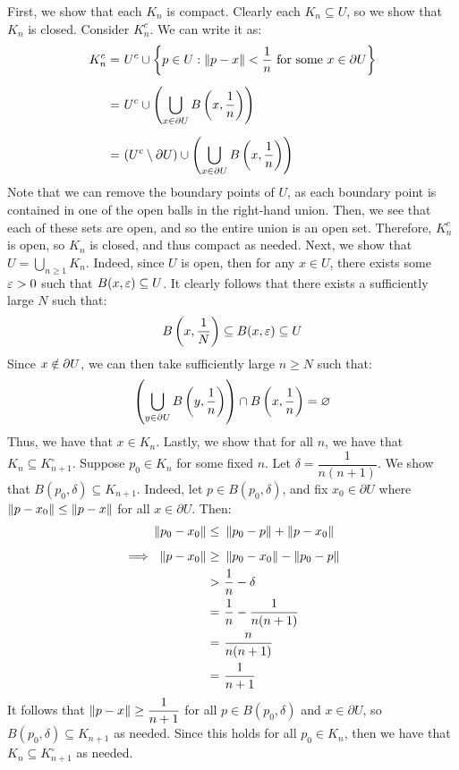 \begin{soln}
    First, we show that each $ K_{n} $ is compact.
    Clearly each $ K_{n} \subseteq U $, so we show that $ K_{n} $ is closed.
    Consider $ K_{n}^{c} $. We can write it as:
    \begin{align*}
        K_{n}^{c} = \ & U^{c} \cup \set{p \in U: \norm{p - x} <
        \frac{1}{n} \trm{ for some } x \in \partial U} \vsp
        = \ & U^{c} \cup \left( \bigcup_{x \in \partial U}
        B \left( x, \frac{1}{n} \right) \right) \vsp
        = \ & (U^{c} \setminus \partial U) \cup \left( \bigcup_{x \in \p U}
        B \left( x, \frac{1}{n} \right) \right)
    \end{align*}
    Note that we can remove the boundary points of $ U $, as each boundary point
    is contained in one of the open balls in the right-hand union.
    Then, we see that each of these sets are open, and so the entire union is an
    open set. Therefore, $ K_{n}^{c} $ is open, so $ K_{n} $ is closed, and thus
    compact as needed. \vsp
    Next, we show that $ U = \bigcup_{n \geq 1}K_{n} $.
    Indeed, since $ U $ is open, then for any $ x \in U $, there exists some
    $ \operatorname{\varepsilon} > 0 $ such that $ B(x, \operatorname{\varepsilon}) \subseteq U $. It clearly follows that
    there exists a sufficiently large $ N $ such that:
    \begin{equation*}
        B \left( x, \frac{1}{N} \right) \subseteq B(x, \operatorname{\varepsilon}) \subseteq U
    \end{equation*}
    Since $ x \notin \partial U $, we can then take sufficiently large $ n \geq N $
    such that:
    \begin{equation*}
        \left( \bigcup_{y \in \partial U}B \left( y, \frac{1}{n} \right) \right)\cap B
        \left( x, \frac{1}{n} \right) = \varnothing
    \end{equation*}
    Thus, we have that $ x \in K_{n} $. \vsp
    Lastly, we show that for all $ n $, we have that $ K_{n} \subseteq
    K_{n+1}^{\circ} $. Suppose $ p_{0} \in K_{n} $ for some fixed $ n $. \vsp
    Let $ \delta = \dfrac{1}{n(n+1)} $. We show that $ B(p_{0}, \delta)\subseteq
    K_{n+1} $. Indeed, let $ p \in B(p_{0}, \delta) $, and fix $ x_{0} \in
    \partial U $ where $ \left\|p - x_{0}\right\| \leq \left\|p - x\right\| $ for all $ x \in
    \partial U $. Then:
    \begin{align*}
        \norm{p_{0} - x_{0}} \leq \ & \norm{p_{0} - p} + \norm{p - x_{0}} \vsp
        \implies \ \norm{p - x_{0}} \geq \ & \norm{p_{0} - x_{0}} - \norm{p_{0}
        - p} \\
        > \ & \frac{1}{n} - \delta \\
        = \ & \frac{1}{n} - \frac{1}{n(n+1)} \\
        = \ & \frac{n}{n(n+1)} \\
        = \ & \frac{1}{n+1}
    \end{align*}
    It follows that $ \left\|p - x\right\| \geq \dfrac{1}{n+1} $ for all $ p \in
    B(p_{0}, \delta) $ and $ x \in \partial U $, so $ B(p_{0}, \delta)
    \subseteq K_{n+1} $ as needed. \vsp
    Since this holds for all $ p_{0} \in K_{n} $, then we have that $ K_{n}
    \subseteq K_{n+1}^{\circ} $ as needed.
\end{soln}

